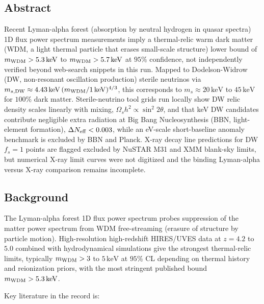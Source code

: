\documentclass[11pt,a4paper]{article}
\begin{document}
\subsection{Abstract}
Recent Lyman-alpha forest (absorption by neutral hydrogen in quasar spectra) 1D flux power spectrum measurements imply a thermal-relic warm dark matter (WDM, a light thermal particle that erases small-scale structure) lower bound of $m_{\rm WDM} > 5.3\,\mathrm{keV}$ to $m_{\rm WDM} > 5.7\,\mathrm{keV}$ at $95\%$ confidence, not independently verified beyond web-search snippets in this run. Mapped to Dodelson-Widrow (DW, non-resonant oscillation production) sterile neutrinos via $m_{s,{\rm DW}} \approx 4.43\,\mathrm{keV}\,(m_{\rm WDM}/1\,\mathrm{keV})^{4/3}$, this corresponds to $m_s \approx 20\,\mathrm{keV}$ to $45\,\mathrm{keV}$ for $100\%$ dark matter. Sterile-neutrino tool grids run locally show DW relic density scales linearly with mixing, $\Omega_s h^2 \propto \sin^2 2\theta$, and that keV DW candidates contribute negligible extra radiation at Big Bang Nucleosynthesis (BBN, light-element formation), $\Delta N_{\rm eff} < 0.003$, while an eV-scale short-baseline anomaly benchmark is excluded by BBN and Planck. X-ray decay line predictions for DW $f_s=1$ points are flagged excluded by NuSTAR M31 and XMM blank-sky limits, but numerical X-ray limit curves were not digitized and the binding Lyman-alpha versus X-ray comparison remains incomplete.

\subsection{Background}
The Lyman-alpha forest 1D flux power spectrum probes suppression of the matter power spectrum from WDM free-streaming (erasure of structure by particle motion). High-resolution high-redshift HIRES/UVES data at $z = 4.2$ to $5.0$ combined with hydrodynamical simulations give the strongest thermal-relic limits, typically $m_{\rm WDM} > 3$ to $5\,\mathrm{keV}$ at $95\%$ CL depending on thermal history and reionization priors, with the most stringent published bound $m_{\rm WDM} > 5.3\,\mathrm{keV}$.

Key literature in the record is:
\end{document}
